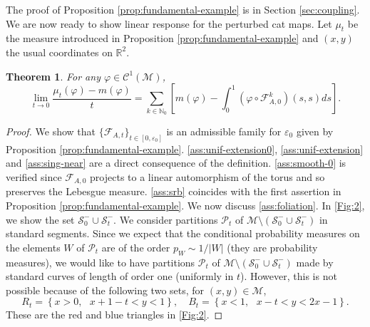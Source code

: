 \documentclass{amsart}
\numberwithin{equation}{section}
\newtheorem{theorem}{Theorem}[section]
\newcommand\ve{\varepsilon}
\newcommand\vf{\varphi}
\newcommand\cC{{\mathcal C}}
\newcommand\cF{{\mathcal F}}
\newcommand\cM{{\mathcal M}}
\newcommand\cS{{\mathcal S}}
\newcommand\bN{{\mathbb N}}
\newcommand\bR{{\mathbb R}}
\newcommand{\catt}{\cF_{A,t}}
\newcommand{\cato}{\cF_{A,0}}
\begin{document}
The proof of Proposition \ref{prop:fundamental-example} is in Section \ref{sec:coupling}. We are now ready to show linear response for the perturbed cat maps. Let \(\mu_t\) be the measure introduced in Proposition \ref{prop:fundamental-example} and \((x,y)\) the usual coordinates on \(\bR^2\).

\begin{theorem}
  \label{thm:cat-lin-resp}
For any \(\vf \in \cC^1(\cM)\),
  \[
    \lim_{t \to 0}\frac{\mu_{t}(\vf) - m(\vf)}{t} = \sum_{k \in \bN_0}\left[m(\vf) - \int_0^1 (\vf \circ \cato^k)(s,s)ds \right].
  \]
\end{theorem}
\begin{proof}
We show that \(\{\catt\}_{t \in [0,\ve_0]}\) is an admissible family for \(\ve_0\) given by Proposition \ref{prop:fundamental-example}. \ref{ass:unif-extension0}, \ref{ass:unif-extension} and \ref{ass:sing-near} are a direct consequence of the definition. \ref{ass:smooth-0} is verified since \(\cato\) projects to a linear automorphism of the torus and so preserves the Lebesgue measure. \ref{ass:srb} coincides with the first assertion in Proposition \ref{prop:fundamental-example}. We now discuss \ref{ass:foliation}. In \ref{Fig:2}, we show the set \(\cS_{0}^{-} \cup \cS_{t}^{-}\). We consider partitions \(\mathscr P_t\) of \(\cM \setminus (\cS_0^{-}\cup \cS_t^{-})\) in standard segments. Since we expect that the conditional probability measures on the elements \(W\) of \(\mathscr P_t\) are of the order \(p_W \sim 1/|W|\) (they are probability measures), we would like to have partitions \(\mathscr P_t\) of \(\cM \setminus (\cS_{0}^{-} \cup \cS_{t}^{-})\) made by standard curves of length of order one (uniformly in \(t\)). However, this is not possible because of the following two sets, for \((x,y) \in \cM\),
\[
   R_t = \left\{ x>0, \text{ }x+1-t<y < 1\right\}, \quad B_t = \left\{ x<1, \text{ }x-t <y<2x-1\right\}.
\]
These are the red and blue triangles in \ref{Fig:2}. 
\hspace{10cm}
\hspace{10cm}
\hspace{10cm}

\end{proof}
\end{document}
